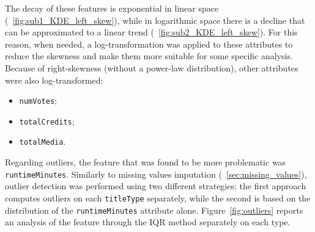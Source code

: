 The decay of these features is exponential in linear space (~\ref{fig:sub1_KDE_left_skew}), while in logarithmic space there is a decline that can be approximated to a linear trend (~\ref{fig:sub2_KDE_left_skew}). 
For this reason, when needed, a log-transformation was applied to these attributes to reduce the skewness and make
them more suitable for some specific analysis.
Because of right-skewness (without a power-law distribution), other attributes were also log-transformed:
\begin{itemize}
    \item \texttt{numVotes};
    \item \texttt{totalCredits};
    \item \texttt{totalMedia}.
\end{itemize}


Regarding outliers, the feature that was found to be more problematic was \texttt{runtimeMinutes}.
Similarly to missing values imputation (~\ref{sec:missing_values}),
outlier detection was performed using two different strategies:
the first approach computes outliers on each \texttt{titleType} separately,
while the second is based on the distribution of the \texttt{runtimeMinutes} attribute alone.
Figure~\ref{fig:outliers} reports an analysis of the feature through the IQR method separately on each type.

